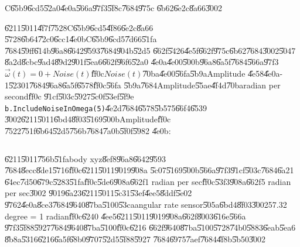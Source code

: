 \clearpage%

\begin{case}
C\U{65b9}\U{6cd5}\U{52a0}\U{4e0a}\U{566a}\U{97f3}\U{5f8c}\U{7684}\U{975c}%
\U{6b62}\U{6e2c}\U{8a66}\U{3002}
\end{case}

\U{6211}\U{5011}\U{4f7f}\U{7528}C\U{65b9}\U{6cd5}\U{4f86}\U{6e2c}\U{8a66}%
\U{5728}\U{6b64}\U{72c0}\U{6cc1}\U{4e0b}C\U{65b9}\U{6cd5}\U{7d66}\U{51fa}%
\U{7684}\U{59ff}\U{614b}\U{96a8}\U{6642}\U{9593}\U{7684}\U{904b}\U{52d5}%
\U{662f}\U{5426}\U{4e5f}\U{662f}\U{975c}\U{6b62}\U{7684}\U{3002}\U{5047}%
\U{8a2d}\U{8cbc}\U{9ad4}\U{89d2}\U{901f}\U{5ea6}\U{662f}\U{96f6}\U{52a0}%
\U{4e0a}\U{4e00}\U{500b}\U{96a8}\U{6a5f}\U{7684}\U{566a}\U{97f3}$\vec{\omega}%
(t)=0+Noise(t)$\U{ff0c}$Noise(t)$\U{70ba}\U{4e00}\U{56fa}\U{5b9a}Amplitude%
\U{4e58}\U{4e0a}-1\U{5230}1\U{7684}\U{96a8}\U{6a5f}\U{6578}\U{ff0c}\U{56fa}%
\U{5b9a}\U{7684}Amplitude\U{55ae}\U{4f4d}\U{70ba}radian per second\U{ff0c}%
\U{91cf}\U{503c}\U{5927}\U{5c0f}\U{53ef}\U{5f9e}\texttt{%
b.IncludeNoiseInOmega(5)}\U{4e2d}\U{7684}\U{6578}\U{5b57}5\U{66f4}\U{6539}%
\U{3002}\U{6211}\U{5011}\U{6bd4}\U{8f03}\U{5169}\U{500b}Amplitude\U{ff0c}%
\U{7522}\U{751f}\U{6b64}\U{52d5}\U{756b}\U{7684}\U{7a0b}\U{5f0f}\U{5982}%
\U{4e0b}:

\bigskip

\begin{mdframed}[leftline=false, rightline=false,backgroundcolor=bg]
\inputminted[linenos,fontsize=\footnotesize]{python}{../../Scripts/cordtrans/Development_zone/sketch-NoiseIncludeInCMethod.py}
\end{mdframed}%

\bigskip

\U{6211}\U{5011}\U{756b}\U{51fa}body xyz\U{8ef8}\U{96a8}\U{6642}\U{9593}%
\U{7684}\U{8ecc}\U{8de1}\U{5716}\U{ff0c}\U{6211}\U{5011}\U{9019}\U{908a}%
\U{5c07}\U{5169}\U{500b}\U{566a}\U{97f3}\U{91cf}\U{503c}\U{7684}\U{6a21}%
\U{64ec}\U{7d50}\U{679c}\U{5283}\U{51fa}\U{ff0c}\U{5de6}\U{908a}\U{662f}1
radian per sec\U{ff0c}\U{53f3}\U{908a}\U{662f}5 radian per sec\U{3002}%
\U{9019}\U{6a23}\U{6211}\U{5011}\U{5c31}\U{53ef}\U{4ee5}\U{8ddf}\U{5e02}%
\U{9762}\U{4e0a}\U{8ce3}\U{7684}\U{9640}\U{87ba}\U{5100}\U{53ca}angular rate
sensor\U{505a}\U{6bd4}\U{8f03}\U{3002}57.32 degree = 1 radian\U{ff0c}\U{6240}%
\U{4ee5}\U{6211}\U{5011}\U{9019}\U{908a}\U{662f}\U{8003}\U{616e}\U{566a}%
\U{97f3}\U{5f88}\U{5927}\U{7684}\U{9640}\U{87ba}\U{5100}\U{ff0c}\U{6216}%
\U{662f}\U{9640}\U{87ba}\U{5100}\U{5728}\U{74b0}\U{5883}\U{6eab}\U{5ea6}%
\U{8b8a}\U{5316}\U{6216}\U{6a5f}\U{68b0}\U{9707}\U{52d5}\U{5f88}\U{5927}%
\U{7684}\U{6975}\U{7aef}\U{7684}\U{4f8b}\U{5b50}\U{3002}

